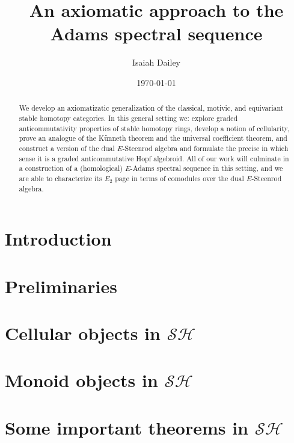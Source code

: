 \documentclass{amsart}
\title{An axiomatic approach to the Adams spectral sequence}
\author{Isaiah Dailey}
\date{\today}
\theoremstyle{plain}
\theoremstyle{definition}
\newcommand{\cSH}{\mathcal{SH}}
\newcommand{\0}{\mathbf{0}}
\renewcommand{\(}{\left(}
\renewcommand{\)}{\right)}
\newcommand{\1}{\mbf{1}}
\begin{document}
\maketitle

\begin{abstract}
  We develop an axiomatizatic generalization of the classical, motivic, and equivariant stable homotopy categories. In this general setting we: explore graded anticommutativity properties of stable homotopy rings,  develop a notion of cellularity, prove an analogue of the K\"unneth theorem and the universal coefficient theorem, and construct a version of the dual $E$-Steenrod algebra and formulate the precise in which sense it is a graded anticommutative Hopf algebroid. All of our work will culminate in a construction of a (homological) $E$-Adams spectral sequence in this setting, and we are able to characterize its $E_2$ page in terms of comodules over the dual $E$-Steenrod algebra. 
\end{abstract}

\tableofcontents

\section{Introduction}\label{section:intro}



\section{Preliminaries}\label{section:prelims}



\section{Cellular objects in \texorpdfstring{$\cSH$}{SH}}\label{section:cellular}



\section{Monoid objects in \texorpdfstring{$\cSH$}{SH}}\label{section:monoid_in_SH}



\section{Some important theorems in \texorpdfstring{$\cSH$}{SH}}\label{section:important}
\end{document}
